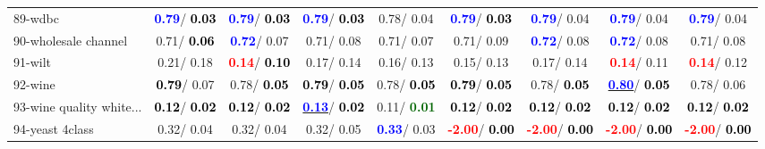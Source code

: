 \begin{table}[h]
\begin{center}
\begin{tabular}{lc|c|c|c|c|c|c|c}
89-wdbc & \textcolor{blue}{\textbf{  0.79}}/\textcolor{black}{\textbf{  0.03}} & \textcolor{blue}{\textbf{  0.79}}/\textcolor{black}{\textbf{  0.03}} & \textcolor{blue}{\textbf{  0.79}}/\textcolor{black}{\textbf{  0.03}} &   0.78/  0.04 & \textcolor{blue}{\textbf{  0.79}}/\textcolor{black}{\textbf{  0.03}} & \textcolor{blue}{\textbf{  0.79}}/  0.04 & \textcolor{blue}{\textbf{  0.79}}/  0.04 & \textcolor{blue}{\textbf{  0.79}}/  0.04 \\
90-wholesale channel &   0.71/\textcolor{black}{\textbf{  0.06}} & \textcolor{blue}{\textbf{  0.72}}/  0.07 &   0.71/  0.08 &   0.71/  0.07 &   0.71/  0.09 & \textcolor{blue}{\textbf{  0.72}}/  0.08 & \textcolor{blue}{\textbf{  0.72}}/  0.08 &   0.71/  0.08 \\
91-wilt &   0.21/  0.18 & \textcolor{red}{\textbf{  0.14}}/\textcolor{black}{\textbf{  0.10}} &   0.17/  0.14 &   0.16/  0.13 &   0.15/  0.13 &   0.17/  0.14 & \textcolor{red}{\textbf{  0.14}}/  0.11 & \textcolor{red}{\textbf{  0.14}}/  0.12 \\
92-wine & \textcolor{black}{\textbf{  0.79}}/  0.07 &   0.78/\textcolor{black}{\textbf{  0.05}} & \textcolor{black}{\textbf{  0.79}}/\textcolor{black}{\textbf{  0.05}} &   0.78/\textcolor{black}{\textbf{  0.05}} & \textcolor{black}{\textbf{  0.79}}/\textcolor{black}{\textbf{  0.05}} &   0.78/\textcolor{black}{\textbf{  0.05}} & \underline{\textcolor{blue}{\textbf{  0.80}}}/\textcolor{black}{\textbf{  0.05}} &   0.78/  0.06 \\ \hline
93-wine quality white... & \textcolor{black}{\textbf{  0.12}}/\textcolor{black}{\textbf{  0.02}} & \textcolor{black}{\textbf{  0.12}}/\textcolor{black}{\textbf{  0.02}} & \underline{\textcolor{blue}{\textbf{  0.13}}}/\textcolor{black}{\textbf{  0.02}} &   0.11/\textcolor{darkgreen}{\textbf{  0.01}} & \textcolor{black}{\textbf{  0.12}}/\textcolor{black}{\textbf{  0.02}} & \textcolor{black}{\textbf{  0.12}}/\textcolor{black}{\textbf{  0.02}} & \textcolor{black}{\textbf{  0.12}}/\textcolor{black}{\textbf{  0.02}} & \textcolor{black}{\textbf{  0.12}}/\textcolor{black}{\textbf{  0.02}} \\
94-yeast 4class &   0.32/  0.04 &   0.32/  0.04 &   0.32/  0.05 & \textcolor{blue}{\textbf{  0.33}}/  0.03 & \textcolor{red}{\textbf{ -2.00}}/\textcolor{black}{\textbf{  0.00}} & \textcolor{red}{\textbf{ -2.00}}/\textcolor{black}{\textbf{  0.00}} & \textcolor{red}{\textbf{ -2.00}}/\textcolor{black}{\textbf{  0.00}} & \textcolor{red}{\textbf{ -2.00}}/\textcolor{black}{\textbf{  0.00}} \\\end{tabular}\label{stratsALCKappa2bC4.5}
\end{center}
\end{table}